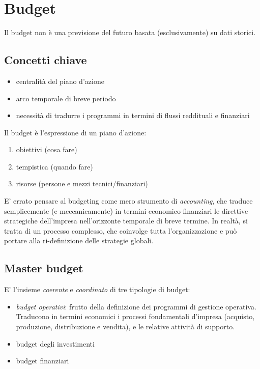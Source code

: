 \chapter{Budget}
Il \gls{budget} non è una previsione del futuro basata
(esclusivamente) su dati storici.
\section{Concetti chiave}
\begin{itemize}
    \item centralità del piano d’azione
    \item arco temporale di breve periodo
    \item necessità di tradurre i programmi in termini di flussi reddituali e
    finanziari
\end{itemize}

Il budget è l’espressione di un piano d’azione:
\begin{enumerate}
	\item obiettivi (cosa fare)
	\item tempistica (quando fare)
	\item risorse (persone e mezzi tecnici/finanziari)
\end{enumerate}

E’ errato pensare al budgeting come mero strumento di \emph{accounting}, che traduce semplicemente (e meccanicamente) in termini economico-finanziari le direttive strategiche dell’impresa nell’orizzonte temporale di breve termine. In realtà, si tratta di un processo complesso, che coinvolge tutta l’organizzazione e può portare alla ri-definizione delle strategie globali.

\section{Master budget}
E’ l’insieme \emph{coerente} e \emph{coordinato} di tre tipologie di budget:
\begin{itemize}
	\item \emph{budget operativi}: frutto della definizione dei programmi di gestione operativa. Traducono in termini economici i processi fondamentali d’impresa (acquisto, produzione, distribuzione e vendita), e le relative attività di supporto.
	\item budget degli investimenti
	\item budget finanziari
\end{itemize}


